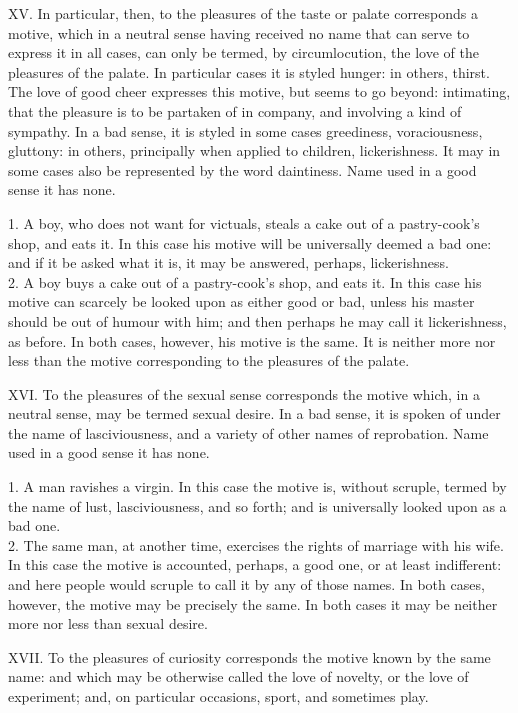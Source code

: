 \documentclass[12pt]{report}
\begin{document}
XV. In particular, then, to the pleasures of the taste or palate
corresponds a motive, which in a neutral sense having received no name
that can serve to express it in all cases, can only be termed, by
circumlocution, the love of the pleasures of the palate. In particular
cases it is styled hunger: in others, thirst. The love of good cheer
expresses this motive, but seems to go beyond: intimating, that the
pleasure is to be partaken of in company, and involving a kind of
sympathy. In a bad sense, it is styled in some cases greediness,
voraciousness, gluttony: in others, principally when applied to
children, lickerishness. It may in some cases also be represented by the
word daintiness. Name used in a good sense it has none.

1. A boy, who does not want for victuals, steals a cake out of a
pastry-cook's shop, and eats it. In this case his motive will be
universally deemed a bad one: and if it be asked what it is, it may be
answered, perhaps, lickerishness.\\
2. A boy buys a cake out of a pastry-cook's shop, and eats it. In this
case his motive can scarcely be looked upon as either good or bad,
unless his master should be out of humour with him; and then perhaps he
may call it lickerishness, as before. In both cases, however, his motive
is the same. It is neither more nor less than the motive corresponding
to the pleasures of the palate.

XVI. To the pleasures of the sexual sense corresponds the motive which,
in a neutral sense, may be termed sexual desire. In a bad sense, it is
spoken of under the name of lasciviousness, and a variety of other names
of reprobation. Name used in a good sense it has none.

1. A man ravishes a virgin. In this case the motive is, without scruple,
termed by the name of lust, lasciviousness, and so forth; and is
universally looked upon as a bad one.\\
2. The same man, at another time, exercises the rights of marriage with
his wife. In this case the motive is accounted, perhaps, a good one, or
at least indifferent: and here people would scruple to call it by any of
those names. In both cases, however, the motive may be precisely the
same. In both cases it may be neither more nor less than sexual desire.

XVII. To the pleasures of curiosity corresponds the motive known by the
same name: and which may be otherwise called the love of novelty, or the
love of experiment; and, on particular occasions, sport, and sometimes
play.
\end{document}
